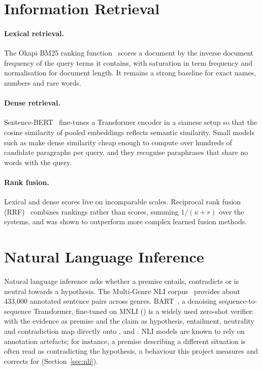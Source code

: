 \section{Information Retrieval}

\paragraph{Lexical retrieval.} The Okapi BM25 ranking function~\citep{robertson2009bm25} scores a document by the inverse document frequency of the query terms it contains, with saturation in term frequency and normalisation for document length. It remains a strong baseline for exact names, numbers and rare words.

\paragraph{Dense retrieval.} Sentence-BERT~\citep{reimers2019sbert} fine-tunes a Transformer encoder in a siamese setup so that the cosine similarity of pooled embeddings reflects semantic similarity. Small models such as  make dense similarity cheap enough to compute over hundreds of candidate paragraphs per query, and they recognise paraphrases that share no words with the query.

\paragraph{Rank fusion.} Lexical and dense scores live on incomparable scales. Reciprocal rank fusion (RRF)~\citep{cormack2009rrf} combines rankings rather than scores, summing $1/(\kappa + r)$ over the systems, and was shown to outperform more complex learned fusion methods.

\section{Natural Language Inference}

Natural language inference asks whether a premise entails, contradicts or is neutral towards a hypothesis. The Multi-Genre NLI corpus~\citep{williams2018mnli} provides about 433{,}000 annotated sentence pairs across genres. BART~\citep{lewis2020bart}, a denoising sequence-to-sequence Transformer, fine-tuned on MNLI () is a widely used zero-shot verifier: with the evidence as premise and the claim as hypothesis, entailment, neutrality and contradiction map directly onto \Sup, \Unk{} and \Con. NLI models are known to rely on annotation artefacts; for instance, a premise describing a different situation is often read as contradicting the hypothesis, a behaviour this project measures and corrects for (Section~\ref{sec:nli}).

